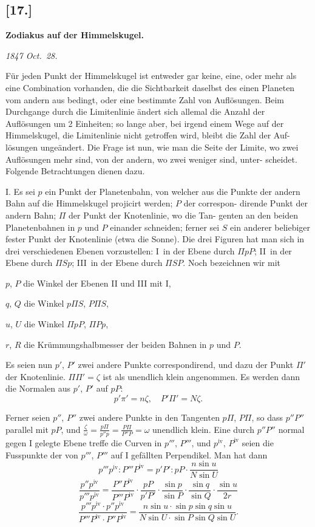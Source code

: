 \documentclass[12pt,a4paper]{article}
\begin{document}
\newpage

\subsection*{[17.]}
\textbf{Zodiakus auf der Himmelskugel.}

\textit{1847 Oct.~28.}

F\"ur jeden Punkt der Himmelskugel ist entweder gar keine, eine, oder
mehr als eine Combination vorhanden, die die Sichtbarkeit daselbst des einen
Planeten vom andern aus bedingt, oder eine bestimmte Zahl von Aufl\"osungen.
Beim Durchgange durch die Limitenlinie \"andert sich allemal die Anzahl der
Aufl\"osungen um 2 Einheiten; so lange aber, bei irgend einem Wege auf der
Himmelskugel, die Limitenlinie nicht getroffen wird, bleibt die Zahl der Auf-
l\"osungen unge\"andert. Die Frage ist nun, wie man die Seite der Limite, wo
zwei Aufl\"osungen mehr sind, von der andern, wo zwei weniger sind, unter-
scheidet. Folgende Betrachtungen dienen dazu.

I. Es sei $p$ ein Punkt der Planetenbahn, von welcher aus die Punkte
der andern Bahn auf die Himmelskugel projicirt werden; $P$ der correspon-
dirende Punkt der andern Bahn; $\Pi$ der Punkt der Knotenlinie, wo die Tan-
genten an den beiden Planetenbahnen in $p$ und $P$ einander schneiden;
ferner sei $S$ ein anderer beliebiger fester Punkt der Knotenlinie (etwa die Sonne).
Die drei Figuren hat man sich in drei verschiedenen Ebenen vorzustellen: I~in
der Ebene durch $\Pi pP$; II~in der Ebene durch $\Pi Sp$; III~in der Ebene
durch $\Pi SP$. Noch bezeichnen wir mit

$p$, $P$ die Winkel der Ebenen II und III mit I,

$q$, $Q$ die Winkel $p\Pi S$, $P\Pi S$,

$u$, $U$ die Winkel $\Pi pP$, $\Pi Pp$,

$r$, $R$ die Kr\"ummungshalbmesser der beiden Bahnen in $p$ und $P$.

Es seien nun $p'$, $P'$ zwei andere Punkte correspondirend, und dazu der
Punkt $\Pi'$ der Knotenlinie. $\Pi\Pi' = \zeta$ ist als unendlich klein angenommen. Es
werden dann die Normalen aus $p'$, $P'$ auf $pP$:
\[
p'\pi' = n\zeta, \quad P'\Pi' = N\zeta.
\]

\newpage

Ferner seien $p''$, $P''$ zwei andere Punkte in den Tangenten $p\Pi$, $P\Pi$, so dass
$p''P''$ parallel mit $pP$, und $\frac{\zeta}{\omega} = \frac{p\Pi}{p''p} = \frac{P\Pi}{P''P} = \omega$ unendlich klein. Eine durch $p''P''$
normal gegen I gelegte Ebene treffe die Curven in $p'''$, $P'''$, und $p^\text{iv}$, $P^\text{iv}$ seien
die Fusspunkte der von $p'''$, $P'''$ auf I gef\"allten Perpendikel. Man hat dann
\[
p'''p^\text{iv} : P'''P^\text{iv} = p'P' : pP \cdot \frac{n\sin u}{N\sin U}
\]
\[
\frac{p''p^\text{iv}}{p'''p^\text{iv}} = \frac{P''P^\text{iv}}{P'''P^\text{iv}} \cdot \frac{pP}{p'P'} \cdot \frac{\sin p}{\sin P} \cdot \frac{\sin q}{\sin Q} \cdot \frac{\sin u}{2r}
\]
\[
\frac{p'''p^\text{iv} \cdot p''p^\text{iv}}{P'''P^\text{iv} \cdot P''P^\text{iv}} = \frac{n\sin u \cdot \sin p \sin q \sin u}{N\sin U \cdot \sin P \sin Q \sin U}.
\]
\end{document}
